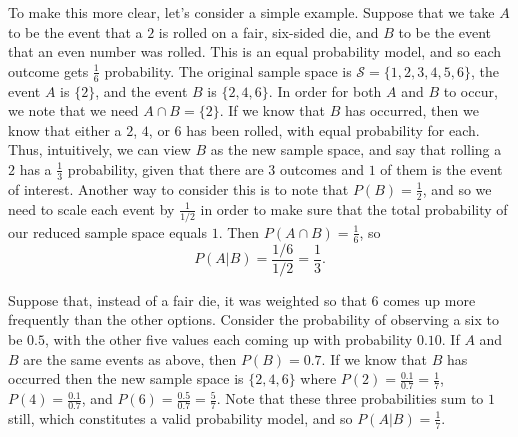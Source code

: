 \documentclass[
  letterpaper,
  DIV=11,
  numbers=noendperiod]{scrreprt}
\theoremstyle{definition}
\theoremstyle{definition}
\theoremstyle{definition}
\theoremstyle{remark}
\begin{document}
To make this more clear, let's consider a simple example. Suppose that
we take \(A\) to be the event that a \(2\) is rolled on a fair,
six-sided die, and \(B\) to be the event that an even number was rolled.
This is an equal probability model, and so each outcome gets
\(\frac{1}{6}\) probability. The original sample space is
\(\mathcal{S} = \{1,2,3,4,5,6\}\), the event \(A\) is \(\{2\}\), and the
event \(B\) is \(\{2,4,6\}\). In order for both \(A\) and \(B\) to
occur, we note that we need \(A \cap B = \{2\}\). If we know that \(B\)
has occurred, then we know that either a \(2\), \(4\), or \(6\) has been
rolled, with equal probability for each. Thus, intuitively, we can view
\(B\) as the new sample space, and say that rolling a \(2\) has a
\(\frac{1}{3}\) probability, given that there are \(3\) outcomes and
\(1\) of them is the event of interest. Another way to consider this is
to note that \(P(B) = \frac{1}{2}\), and so we need to scale each event
by \(\frac{1}{1/2}\) in order to make sure that the total probability of
our reduced sample space equals \(1\). Then
\(P(A\cap B) = \frac{1}{6}\), so
\[P(A|B) = \frac{1/6}{1/2} = \frac{1}{3}.\]

Suppose that, instead of a fair die, it was weighted so that \(6\) comes
up more frequently than the other options. Consider the probability of
observing a six to be \(0.5\), with the other five values each coming up
with probability \(0.10\). If \(A\) and \(B\) are the same events as
above, then \(P(B) = 0.7\). If we know that \(B\) has occurred then the
new sample space is \(\{2,4,6\}\) where
\(P(2) = \frac{0.1}{0.7} = \frac{1}{7}\), \(P(4) = \frac{0.1}{0.7}\),
and \(P(6) = \frac{0.5}{0.7} = \frac{5}{7}\). Note that these three
probabilities sum to \(1\) still, which constitutes a valid probability
model, and so \(P(A|B) = \frac{1}{7}\).
\end{document}
